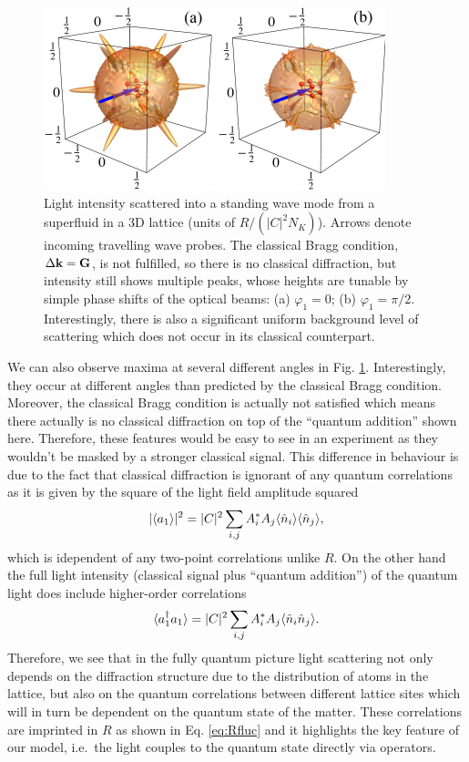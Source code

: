 \begin{figure}
  \centering
  \includegraphics[width=\linewidth]{Ep1}
  \caption[Light Scattering Angular Distribution]{Light intensity
    scattered into a standing wave mode from a superfluid in a 3D
    lattice (units of $R/(|C|^2N_K)$). Arrows denote incoming
    travelling wave probes. The classical Bragg condition,
    $\Delta \mathbf{k} = \mathbf{G}$, is not fulfilled, so there is no classical
    diffraction, but intensity still shows multiple peaks, whose
    heights are tunable by simple phase shifts of the optical beams:
    (a) $\varphi_1=0$; (b) $\varphi_1=\pi/2$. Interestingly, there is
    also a significant uniform background level of scattering which
    does not occur in its classical counterpart. }
  \label{fig:scattering}
\end{figure}

We can also observe maxima at several different angles in
Fig. \ref{fig:scattering}. Interestingly, they occur at different
angles than predicted by the classical Bragg condition. Moreover, the
classical Bragg condition is actually not satisfied which means there
actually is no classical diffraction on top of the ``quantum
addition'' shown here. Therefore, these features would be easy to see
in an experiment as they wouldn't be masked by a stronger classical
signal.  This difference in behaviour is due to the fact that
classical diffraction is ignorant of any quantum correlations as it is
given by the square of the light field amplitude squared
\begin{equation}
  |\langle a_1 \rangle|^2 = |C|^2 \sum_{i,j} A_i^*
  A_j \langle \hat{n}_i \rangle \langle \hat{n}_j \rangle,
\end{equation}
which is idependent of any two-point correlations unlike $R$. On the
other hand the full light intensity (classical signal plus ``quantum
addition'') of the quantum light does include higher-order
correlations
\begin{equation}
  \langle a^\dagger_1 a_1 \rangle = |C|^2 \sum_{i,j} A_i^*
  A_j \langle \hat{n}_i \hat{n}_j \rangle.
\end{equation}
Therefore, we see that in the fully quantum picture light scattering
not only depends on the diffraction structure due to the distribution
of atoms in the lattice, but also on the quantum correlations between
different lattice sites which will in turn be dependent on the quantum
state of the matter. These correlations are imprinted in $R$ as shown
in Eq. \eqref{eq:Rfluc} and it highlights the key feature of our
model, i.e.~the light couples to the quantum state directly via
operators.

